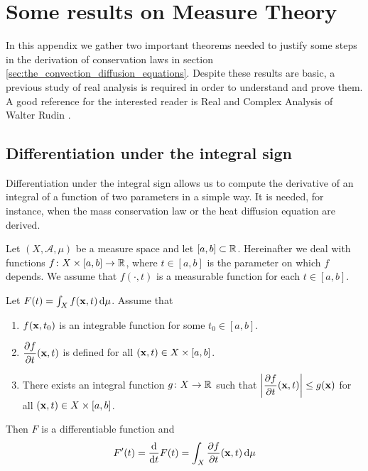 
\section{Some results on Measure Theory}

In this appendix we gather two important theorems needed to justify some steps in the derivation of conservation laws in section \ref{sec:the_convection_diffusion_equations}. Despite these results are basic, a previous study of real analysis is required in order to understand and prove them. A good reference for the interested reader is Real and Complex Analysis of Walter Rudin \cite{rudin1987real}. 

\subsection{Differentiation under the integral sign}

Differentiation under the integral sign allows us to compute the derivative of an integral of a function of two parameters in a simple way. It is needed, for instance, when the mass conservation law or the heat diffusion equation are derived. 

Let $(X, \mathcal{A}, \mu)$ be a measure space and let $[a, b] \subset \mathbb{R}$. Hereinafter we deal with functions $f \colon X \times [a,b] \rightarrow \mathbb{R}$, where $t \in [a, b]$ is the parameter on which $f$ depends. We assume that $f(\cdot, t)$ is a measurable function for each $t \in [a, b]$.

\begin{theorem} \label{theo:differentiation_under_the_integral_sign}
	Let $F(t) = \int_X f(\vb{x},t) \dd{\mu}$. Assume that
	\begin{enumerate}[label={(\roman*)}, topsep=0pt]
		\item $f(\vb{x},t_0)$ is an integrable function for some $t_0 \in [a,b]$.
		\item $\dfrac{\partial f}{\partial t}(\vb{x},t)$ is defined for all $(\vb{x}, t) \in X \times [a, b]$.
		\item There exists an integral function $g \colon X \rightarrow \mathbb{R}$ such that $\abs{\dfrac{\partial f}{\partial t} (\vb{x},t)} \leq g(\vb{x})$ for all $(\vb{x}, t) \in X \times [a, b]$.
	\end{enumerate}
	Then $F$ is a differentiable function and
	\[
		F'(t) = \frac{\dd}{\dd t} F(t) = \int_X \frac{\partial f}{\partial t}(\vb{x},t) \dd{\mu}
	\]
\end{theorem}

